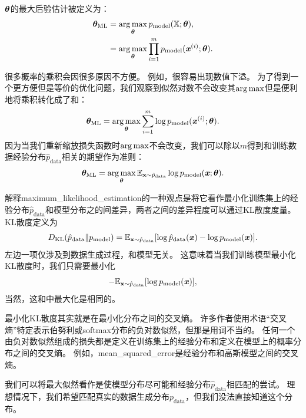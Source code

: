  $\boldsymbol{\theta}$的最大后验估计被定义为：
\begin{align}
    \boldsymbol{\theta}_{\text{ML}} &= \underset{\boldsymbol{\theta}}{\arg\max} \, p_{\text{model}} (\mathbb{X}; \boldsymbol{\theta}), \\
        &= \underset{\boldsymbol{\theta}}{\arg\max} \prod_{i=1}^m p_{\text{model}} (\boldsymbol{\mathit{x}}^{(i)}; \boldsymbol{\theta}).
\end{align}

很多概率的乘积会因很多原因不方便。
例如，很容易出现数值下溢。
为了得到一个更方便但是等价的优化问题，我们观察到似然对数不会改变其$\arg\max$但是便利地将乘积转化成了和：
\begin{equation}
    \boldsymbol{\theta}_{\text{ML}} = \underset{\boldsymbol{\theta}}{\arg\max} \sum_{i=1}^m \log p_{\text{model}} (\boldsymbol{\mathit{x}}^{(i)}; \boldsymbol{\theta}) .
\end{equation}
因为当我们重新缩放损失函数时$\arg\max$不会改变，我们可以除以$m$得到和训练数据经验分布$\hat{p}_{\text{data}}$相关的期望作为准则：
\begin{equation}
\label{eq:5.59}
    \boldsymbol{\theta}_{\text{ML}} = \underset{\boldsymbol{\theta}}{\arg\max} \,\mathbb{E}_{\mathbf{x} \sim \hat{p}_{\text{data}}} \log p_{\text{model}} (\boldsymbol{\mathit{x}}; \boldsymbol{\theta}) .
\end{equation}

解释\gls{maximum_likelihood_estimation}的一种观点是将它看作最小化训练集上的经验分布$\hat{p}_{\text{data}}$和模型分布之的间差异，两者之间的差异程度可以通过KL散度度量。
KL散度定义为
\begin{equation}
    D_{\text{KL}}(\hat{p}_{\text{data}} \| p_{\text{model}}) = \mathbb{E}_{\mathbf{x} \sim \hat{p}_{\text{data}}} [ \log \hat{p}_{\text{data}}(\boldsymbol{\mathit{x}}) - \log p_{\text{model}}(\boldsymbol{\mathit{x}}) ] .
\end{equation}
左边一项仅涉及到数据生成过程，和模型无关。
这意味着当我们训练模型最小化KL散度时，我们只需要最小化
\begin{equation}
    -\mathbb{E}_{\mathbf{x} \sim \hat{p}_{\text{data}}} [ \log p_{\text{model}}(\boldsymbol{\mathit{x}})  ] ,
\end{equation}
当然，这和中最大化是相同的。


最小化KL散度其实就是在最小化分布之间的交叉熵。
许多作者使用术语``交叉熵''特定表示伯努利或softmax分布的负对数似然，但那是用词不当的。
任何一个由负对数似然组成的损失都是定义在训练集上的经验分布和定义在模型上的概率分布之间的交叉熵。
例如，\gls{mean_squared_error}是经验分布和高斯模型之间的交叉熵。

我们可以将最大似然看作是使模型分布尽可能和经验分布$\hat{p}_{\text{data}}$相匹配的尝试。
理想情况下，我们希望匹配真实的数据生成分布$p_{\text{data}}$，但我们没法直接知道这个分布。

